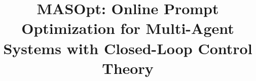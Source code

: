 \title{MASOpt: Online Prompt Optimization for Multi-Agent Systems 
with Closed-Loop Control Theory}
